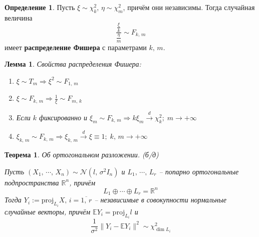 \documentclass[a4paper,12pt]{article}
\theoremstyle{plain}
\newtheorem{theorem}{Теорема}[section]
\newtheorem{lemma}{Лемма}[section]
\theoremstyle{definition}
\newtheorem{definition}{Определение}[section]
\theoremstyle{remark}
\begin{document}
\begin{definition}
  Пусть $\xi \sim \chi^2_k,\, \eta \sim \chi^2_m$, причём они независимы. Тогда случайная величина
  \[
    \frac{\frac{\xi}{k}}{\frac{\eta}{m}} \sim F_{k,\,m}
  \]
  имеет \textbf{распределение Фишера} с параметрами $k,\,m$.
\end{definition}

\begin{lemma}
  Свойства распределения Фишера:
  \begin{enumerate}
    \item $\xi \sim T_m \Rightarrow \xi^2 \sim F_{1,\,m}$
    \item $\xi \sim F_{k,\,m} \Rightarrow \frac{1}{\xi} \sim F_{m,\,k}$
    \item Если $k$ фиксированно и $\xi_m \sim F_{k,\,m} \Rightarrow k\xi_m \overset{d}{\to} \chi^2_k;\; m \to +\infty$
    \item $\xi_{k,\,m} \sim F_{k,\,m} \Rightarrow \xi_{k,\,m} \overset{d}{\to} \xi \equiv 1;\; k,\,m \to +\infty$
  \end{enumerate}
\end{lemma}

\begin{theorem}\label{ORT_RAZL}
  Об ортогональном разложении. (б/д)

  Пусть $(X_1,\,\cdots,\,X_n) \sim \mathcal{N}(l,\,\sigma^2I_n)$ и $L_1,\,\cdots,\,L_r$ -- попарно ортогональные подпространства $\mathbb{R}^n$, причём 
  \[
    L_1\oplus\cdots\oplus L_r = \mathbb{R}^n
  \]
  Тогда $Y_i := \text{proj}_{L_i}X,\, i = \overline{1,\,r}$ -- независимые в совокупности нормальные случайные векторы, причём $\mathbb{E}Y_i = \text{proj}_{L_i}l$ и
  \[
    \frac{1}{\sigma^2}\|Y_i - \mathbb{E}Y_i\|^2 \sim \chi^2_{\dim L_i}
  \]
\end{theorem}
\end{document}
